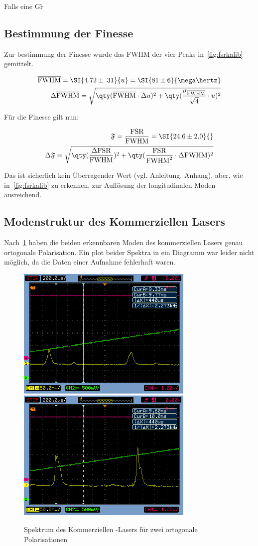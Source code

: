 \documentclass[slug=GL, room=HZDR\ Dresden/Rossendorf\,\ Geb.\ 620/123, supervisor=Tim\ Ziegler]{../../Lab_Report_LaTeX/lab_report}
\newcommand{\hne}{\ce{HeNe}-Laser}
\begin{document}
Falls eine Gr\"
\subsection{Bestimmung der Finesse}
\label{sec:bestfinesse}

Zur bestimmung der Finesse wurde das FWHM der vier Peaks
in~\ref{fig:fsrkalib} gemittelt.

\begin{eqnarray}
  \label{eq:fwhmlaser}
  \overline{\text{FWHM}} = \SI{4.72\pm .31}{u} = \SI{81\pm
    6}{\mega\hertz} \\
  \Delta\overline{\text{FWHM}} =
  \sqrt{\qty(\overline{\text{FWHM}}\cdot\Delta u)^2 +
  \qty(\frac{\sigma_{\overline{\text{FWHM}}}}{\sqrt{4}}\cdot u)^2}
\end{eqnarray}

F\"ur die Finesse gilt nun:

\begin{eqnarray}
  \label{eq:finesselaser}
  \mathfrak{F}=\frac{\text{FSR}}{\text{FWHM}}=\SI{24.6\pm 2.0}{} \\
  \Delta\mathfrak{F} =
  \sqrt{\qty(\frac{\Delta\text{FSR}}{\text{FWHM}})^2 + \qty(\frac{\text{FSR}}{\text{FWHM}^2}\cdot\Delta\text{FWHM})^2}
\end{eqnarray}

Das ist sicherlich kein \"Uberragender Wert (vgl. Anleitung, Anhang),
aber, wie in~\ref{fig:fsrkalib} zu erkennen, zur Aufl\"osung der
longitudinalen Moden ausreichend.

\subsection{Modenstruktur des Kommerziellen Lasers}

Nach~\ref{fig:polarisations} haben die beiden erkennbaren Moden des
kommerziellen Lasers genau ortogonale Polarisation. Ein plot beider
Spektra in ein Diagramm war leider nicht m\"oglich, da die Daten einer
Aufnahme fehlerhaft waren.


\label{sec:modsturkom}
\begin{figure}[b]\centering
  \includegraphics[width=.3\columnwidth]{pol1.png}
  \includegraphics[width=.3\columnwidth]{pol2.png}
  \caption[Gauss]{Spektrum des Kommerziellen \hne{}s f\"ur zwei
    ortogonale Polarisationen}
  \label{fig:polarisations}
\end{figure}
\end{document}
